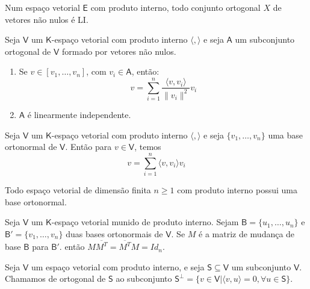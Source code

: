 \documentclass[10pt,a4paper]{article}
\begin{document}
\begin{theorem}
	Num espaço vetorial $\textsf{E}$ com produto interno, todo conjunto ortogonal $X$ de vetores não nulos é LI.
\end{theorem}

\begin{proposition} 
	Seja $\mathsf{V}$ um $\mathsf{K}$-espaço vetorial com produto interno $\langle, \rangle$ e seja $\mathsf{A}$ um subconjunto ortogonal de $\mathsf{V}$ formado por vetores não nulos.
	\begin{enumerate}[label=(\alph*)]
		\item Se $v \in [ v_1, \dots, v_n ]$, com $v_i \in \mathsf{A}$, então:
		\[
			v = \sum_{i = 1}^{n} \frac{\langle v, v_i \rangle}{\lVert v_i \rVert ^ 2}v_i
		\]
		\item $\mathsf{A}$ é linearmente independente.
	\end{enumerate}
\end{proposition}

\begin{corollary} 
	Seja $\mathsf{V}$ um $\mathsf{K}$-espaço vetorial com produto interno $\langle, \rangle$ e seja $\{ v_1, \dots, v_n \}$ uma base ortonormal de $\mathsf{V}$. Então para $v \in \mathsf{V}$, temos
	\[
		v = \sum_{i = 1}^{n} \langle v, v_i \rangle v_i
	\]
\end{corollary}

\begin{theorem} 
	Todo espaço vetorial de dimensão finita $n \geq 1$ com produto interno possui uma base ortonormal.
\end{theorem}

\begin{corollary} 
	Seja $\mathsf{V}$ um $\mathsf{K}$-espaço vetorial munido de produto interno. Sejam $\mathsf{B} = \{ u_1,\dots, u_n \}$ e $\mathsf{B'} = \{ v_1,\dots, v_n \}$ duas bases ortonormais de $\mathsf{V}$. Se $M$ é a matriz de mudança de base $\mathsf{B}$ para $\mathsf{B'}$. então $M \overline{M ^ T} = \overline{M ^ T} M = Id_n$.
\end{corollary}

\begin{definition} 
	Seja $\textsf{V}$ um espaço vetorial com produto interno, e seja $\mathsf{S} \subseteq \mathsf{V}$ um subconjunto $\mathsf{V}$. Chamamos de ortogonal de $\mathsf{S}$ ao subconjunto $\mathsf{S} ^ \perp = \{ v \in \mathsf{V} | \langle v, u \rangle = 0, \forall u \in \mathsf{S} \}$.
\end{definition}
\end{document}
